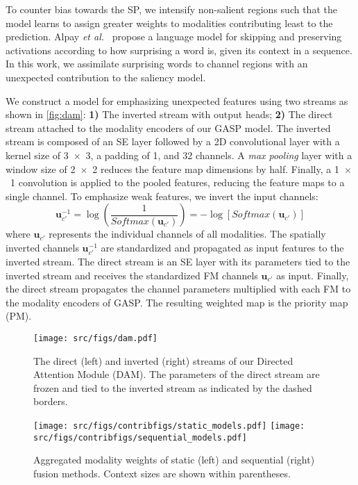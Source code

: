 \documentclass{article}
\begin{document}
To counter bias towards the SP, we intensify non-salient regions such that the model learns to assign greater weights to modalities contributing least to the prediction. Alpay \textit{et al.}~ propose a language model for skipping and preserving activations according to how surprising a word is, given its context in a sequence.
In this work, we assimilate surprising words to channel regions with an unexpected contribution to the saliency model.

We construct a model for emphasizing unexpected features using two streams as shown in \autoref{fig:dam}: \textbf{1)} The inverted stream with output heads; \textbf{2)} The direct stream attached to the modality encoders of our GASP model. The inverted stream is composed of an SE layer followed by a 2D convolutional layer with a kernel size of 3~$\times$~3, a padding of 1, and 32 channels. A \textit{max pooling} layer with a window size of 2~$\times$~2 reduces the feature map dimensions by half. Finally, a 1~$\times$~1 convolution is applied to the pooled features, reducing the feature maps to a single channel. 
To emphasize weak features, we invert the input channels:
\begin{equation}
    \label{eq:surprisal}
    \mathbf{u}^{-1}_{c'} = \log \left( \frac{1}{Softmax(\mathbf{u}_{c'})} \right) = -\log[Softmax(\mathbf{u}_{c'})]
\end{equation}
where $\mathbf{u}_{c'}$ represents the individual channels of all modalities. The spatially inverted channels $\mathbf{u}^{-1}_{c'}$ are standardized and propagated as input features to the inverted stream. The direct stream is an SE layer with its parameters tied to the inverted stream and receives the standardized FM channels $\mathbf{u}_{c'}$ as input. Finally, the direct stream propagates the channel parameters multiplied with each FM to the modality encoders of GASP. The resulting weighted map is the priority map (PM).

\begin{figure}[t]
\centering
\texttt{[image: src/figs/dam.pdf]}
\caption{The direct (left) and inverted (right) streams of our Directed Attention Module (DAM). The parameters of the direct stream are frozen and tied to the inverted stream as indicated by the dashed borders.}
\label{fig:dam}
\end{figure}

\begin{figure*}[ht]
\centering

{\texttt{[image: src/figs/contribfigs/static\_models.pdf]}
\label{cat}}
{\texttt{[image: src/figs/contribfigs/sequential\_models.pdf]}
\label{bat}}





\caption{Aggregated modality weights of static (left) and sequential (right) fusion methods. Context sizes are shown within parentheses.}
\label{fig:combchart}
\end{figure*}
\end{document}
